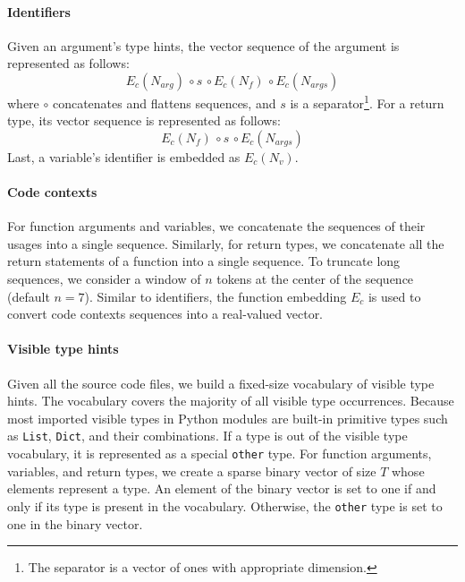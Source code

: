 \paragraph{Identifiers} Given an argument's type hints, the vector sequence of the argument is represented as follows:
\begin{equation*}
E_{c}(N_{arg}) \, \circ s \, \circ E_{c}(N_{f}) \, \circ E_{c}(N_{args})
\end{equation*}
where $\circ$ concatenates and flattens sequences, and $s$ is a separator\footnote{The separator is a vector of ones with appropriate dimension.}. For a return type, its vector sequence is represented as follows:
\begin{equation*}
E_{c}(N_{f}) \, \circ s \, \circ E_{c}(N_{args})
\end{equation*}
Last, a variable's identifier is embedded as $E_{c}({N_{v}})$.

\paragraph{Code contexts} For function arguments and variables, we concatenate the sequences of their usages into a single sequence. Similarly, for return types, we concatenate all the return statements of a function into a single sequence. To truncate long sequences, we consider a window of $n$ tokens at the center of the sequence (default $n=7$). Similar to identifiers, the function embedding $E_{c}$ is used to convert code contexts sequences into a real-valued vector.

\paragraph{Visible type hints} Given all the source code files, we build a fixed-size vocabulary of visible type hints. The vocabulary covers the majority of all visible type occurrences. Because most imported visible types in Python modules are built-in primitive types such as \texttt{List}, \texttt{Dict}, and their combinations. If a type is out of the visible type vocabulary, it is represented as a special \texttt{other} type. For function arguments, variables, and return types, we create a sparse binary vector of size $T$ whose elements represent a type. An element of the binary vector is set to one if and only if its type is present in the vocabulary. Otherwise, the \texttt{other} type is set to one in the binary vector.

